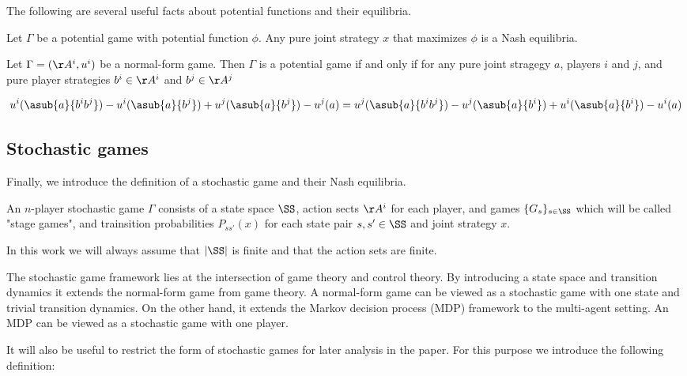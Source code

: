 The following are several useful facts about potential functions and their equilibria.

\begin{thm}
Let $\Gamma$ be a potential game with potential function $\phi$. Any pure joint strategy $x$ that maximizes $\phi$ is a Nash equilibria.
\end{thm}



\begin{thm}
Let $\Gamma = (\AA^i, u^i)$ be a normal-form game. Then $\Gamma$ is a potential game if and only if for any pure joint stragegy $a$, players $i$ and $j$, and pure player strategies $b^i \in \AA^i$ and $b^j \in \AA^j$

$$
u^i(\asub{a}{b^ib^j}) - u^i(\asub{a}{b^j}) + u^j(\asub{a}{b^j}) - u^j(a) = u^j(\asub{a}{b^ib^j}) - u^j(\asub{a}{b^i}) + u^i(\asub{a}{b^i}) - u^i(a)
$$
\end{thm}


\subsection{Stochastic games}

Finally, we introduce the definition of a stochastic game and their Nash equilibria.

\begin{mydef}
An $n$-player stochastic game $\Gamma$ consists of a state space $\SS$, action sects $\AA^i$ for each player, and games $\{G_s\}_{s \in \SS}$ which will be called "stage games", and trainsition probabilities $P_{ss'}(x)$ for each state pair $s, s' \in \SS$ and joint strategy $x$.
\end{mydef}

In this work we will always assume that $| \SS |$ is finite and that the action sets are finite.

The stochastic game framework lies at the intersection of game theory and control theory. By introducing a state space and transition dynamics it extends the normal-form game from game theory. A normal-form game can be viewed as a stochastic game with one state and trivial transition dynamics. On the other hand, it extends the Markov decision process (MDP) framework to the multi-agent setting. An MDP can be viewed as a stochastic game with one player. 

It will also be useful to restrict the form of stochastic games for later analysis in the paper. For this purpose we introduce the following definition:

